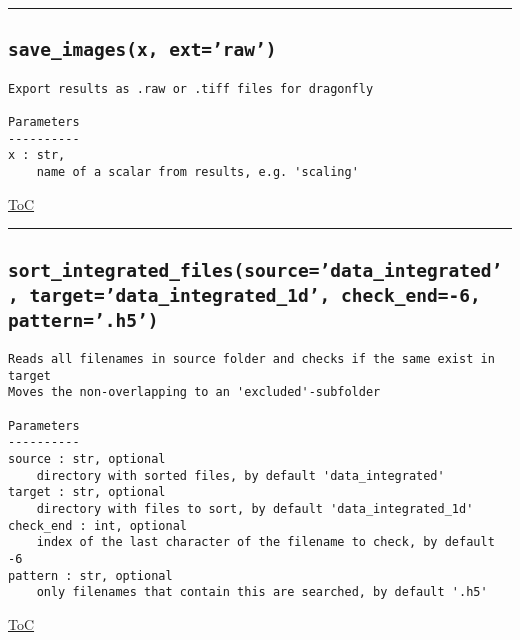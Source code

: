 \documentclass{article}
\begin{document}


\vspace{5mm}

\hrule

\subsection*{\texttt{save\_images(x, ext='raw')}}

\begin{lstlisting}[language=docstring]
Export results as .raw or .tiff files for dragonfly

Parameters
----------
x : str,
    name of a scalar from results, e.g. 'scaling'
\end{lstlisting}

\begin{flushright}

\hyperref[toc]{ToC}

\end{flushright}



\vspace{5mm}

\hrule

\subsection*{\texttt{sort\_integrated\_files(source='data\_integrated', target='data\_integrated\_1d', check\_end=-6, pattern='.h5')}}

\begin{lstlisting}[language=docstring]
Reads all filenames in source folder and checks if the same exist in target
Moves the non-overlapping to an 'excluded'-subfolder 

Parameters
----------
source : str, optional
    directory with sorted files, by default 'data_integrated'
target : str, optional
    directory with files to sort, by default 'data_integrated_1d'
check_end : int, optional
    index of the last character of the filename to check, by default -6
pattern : str, optional
    only filenames that contain this are searched, by default '.h5'
\end{lstlisting}

\begin{flushright}

\hyperref[toc]{ToC}

\end{flushright}
\end{document}
